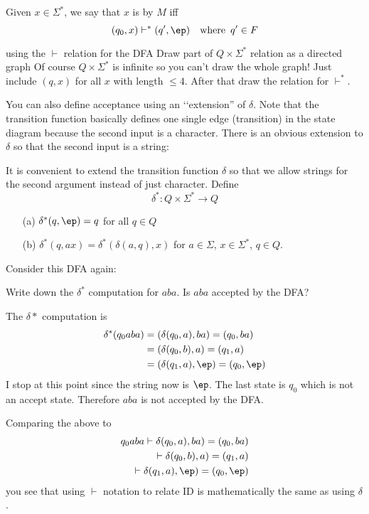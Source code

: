 \begin{defn}
Given $x \in \Sigma^*$, we say that $x$ is
 by $M$ iff
\[(q_0,x) \vdash^* (q',\ep) \quad \text{where \,} q' \in F \]
\end{defn}





\begin{eg}
  using the $\vdash$ relation for the DFA
  Draw part of $Q \times \Sigma^*$ relation as a directed graph
Of course $Q \times \Sigma^*$ is infinite so you can't
draw the whole graph!
Just include $(q, x)$ for all $x$ with length $\leq 4$.
After that draw the relation for $\vdash^*$.
\end{eg}

\newpage
You can also define acceptance using an \lq\lq extension'' of $\delta$.
Note that the transition function basically defines one single
edge (transition) in the state diagram because the second input is a
character.
There is an obvious extension to $\delta$ so that the second
input is a string:

\begin{defn}
It is convenient to extend the transition function $\delta$ so that
we allow strings for the second argument instead of just character.
Define
\[
 \delta^* : Q \times \Sigma^* \rightarrow Q
\]
\begin{itemize}
 \item[(a)] $\delta^*(q, \ep) = q$ for all $q \in Q$
 \item[(b)] $\delta^*(q, ax) = \delta^*( \delta(a,q), x)$ for $a \in
 \Sigma$, $x \in \Sigma^*$, $q \in Q$.
\end{itemize}
\end{defn}


\begin{eg} Consider this DFA again:

  Write down the $\delta^*$
  computation for $aba$. Is $aba$ accepted by the DFA?

  The $\delta*$ computation is
  \begin{align*}
    \delta^*(q_0 aba)
    &= (\delta(q_0, a), ba) = (q_0, ba) \\
    &= (\delta(q_0, b), a) = (q_1, a) \\
    &= (\delta(q_1, a), \ep) = (q_0, \ep)
  \end{align*}
  I stop at this point since the string now is $\ep$.
  The last state is $q_0$ which is not an accept state.
  Therefore
  $aba$ is not accepted by the DFA.

  Comparing the above to
    \begin{align*}
    q_0 aba
    \vdash \delta(q_0, a), ba) = (q_0, ba) \\ 
    \vdash \delta(q_0, b), a) = (q_1, a) \\
    \vdash \delta(q_1, a), \ep) = (q_0, \ep)
  \end{align*}
    you see that using $\vdash$ notation to relate
    ID is mathematically the same as
    using $\delta$.
\end{eg}

